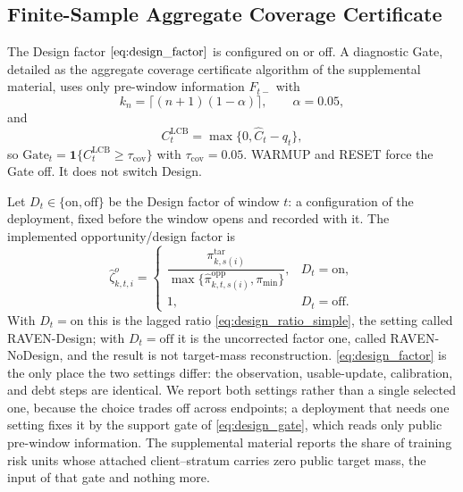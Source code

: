 \documentclass[letterpaper,journal]{IEEEtran}
\begin{document}
\subsection{Finite-Sample Aggregate Coverage Certificate}
\label{subsec:agg_certificate_alg}

The Design factor $\eqref{eq:design_factor}$ is configured on or off.  A
diagnostic Gate, detailed as the aggregate coverage certificate algorithm of the
supplemental material, uses only pre-window information $F_{t-}$ with
\begin{equation}
 k_n=\lceil(n+1)(1-\alpha)\rceil,
 \qquad
 \alpha=0.05,
 \label{eq:agg_kn}
\end{equation}
and
\begin{equation}
 C^{\mathrm{LCB}}_t=\max\{0,\widehat C_t-q_t\},
 \label{eq:agg_CLCB}
\end{equation}
so $\mathrm{Gate}_t=\mathbf{1}\{C^{\mathrm{LCB}}_t\ge\tau_{\mathrm{cov}}\}$ with
$\tau_{\mathrm{cov}}=0.05$.  WARMUP and RESET force the Gate off.  It does
not switch Design.

Let $D_t\in\{\mathrm{on},\mathrm{off}\}$ be the Design factor of window $t$:
a configuration of the deployment, fixed before the window opens and recorded
with it.  The implemented opportunity/design factor is
\begin{equation}
\widehat\zeta^{o}_{k,t,i}
=
\begin{cases}
\dfrac{\pi^{\mathrm{tar}}_{k,s(i)}}
{\max\{\widehat\pi^{\mathrm{opp}}_{k,t,s(i)},\pi_{\min}\}}, & D_t=\mathrm{on},\\[1.5mm]
1, & D_t=\mathrm{off}.
\end{cases}
\label{eq:design_factor}
\end{equation}
With $D_t=\mathrm{on}$ this is the lagged ratio
\eqref{eq:design_ratio_simple}, the setting called RAVEN-Design; with
$D_t=\mathrm{off}$ it is the uncorrected factor one, called RAVEN-NoDesign,
and the result is not target-mass reconstruction.
\eqref{eq:design_factor} is the only place the two settings differ: the
observation, usable-update, calibration, and debt steps are identical.
We report both settings rather than a single selected one, because the choice
trades off across endpoints; a deployment that needs one setting fixes it by the
support gate of \eqref{eq:design_gate}, which reads only public pre-window
information.  The supplemental material reports the share of training risk units
whose attached client--stratum carries zero public target mass, the input of that
gate and nothing more.
\end{document}
